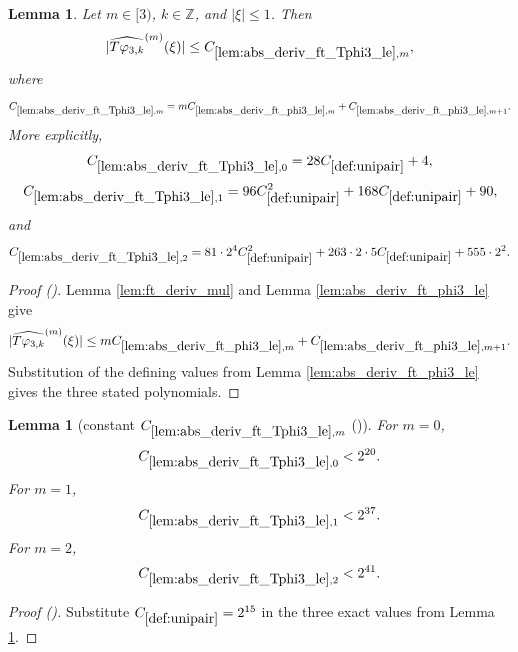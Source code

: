 \documentclass[12pt,reqno]{amsart}
\newcommand{\auto}{{({\tiny\faCar})}}
\theoremstyle{plain}
\newtheorem{lemma}[theorem]{Lemma}
\numberwithin{equation}{section}
\theoremstyle{remark}
\newcommand{\uses}[1]{}
\newcommand{\usesdefs}[1]{}
\newcommand{\Z}{{\mathbb Z}}
\begin{document}
\begin{lemma}\label{lem:abs_deriv_ft_Tphi3_le}\uses{lem:ft_deriv_mul,lem:abs_deriv_ft_phi3_le}\usesdefs{def:unipair,defn:window based bump functions}
Let $m\in[3)$, $k\in\Z$, and $|\xi|\le1$. Then
\begin{equation}\label{auto:T-varphi-three-Fourier-derivative-bound}
|\widehat{T\varphi_{3,k}}^{(m)}(\xi)|
\le C_{\ref{lem:abs_deriv_ft_Tphi3_le},m},
\end{equation}
where
\begin{equation}\label{auto:T-varphi-three-Fourier-derivative-constant}
C_{\ref{lem:abs_deriv_ft_Tphi3_le},m}
=mC_{\ref{lem:abs_deriv_ft_phi3_le},m}
+C_{\ref{lem:abs_deriv_ft_phi3_le},m+1}.
\end{equation}
More explicitly,
\begin{equation}\label{auto:T-varphi-three-Fourier-derivative-constant-zero-exact}
C_{\ref{lem:abs_deriv_ft_Tphi3_le},0}=28C_{\ref{def:unipair}}+4,
\end{equation}
\begin{equation}\label{auto:T-varphi-three-Fourier-derivative-constant-one-exact}
C_{\ref{lem:abs_deriv_ft_Tphi3_le},1}=96C_{\ref{def:unipair}}^2+168C_{\ref{def:unipair}}+90,
\end{equation}
and
\begin{equation}\label{auto:T-varphi-three-Fourier-derivative-constant-two-exact}
C_{\ref{lem:abs_deriv_ft_Tphi3_le},2}=81\cdot2^4C_{\ref{def:unipair}}^2+263\cdot2\cdot5C_{\ref{def:unipair}}+555\cdot2^2.
\end{equation}
\end{lemma}
\begin{proof}[Proof \auto]
Lemma \ref{lem:ft_deriv_mul} and Lemma \ref{lem:abs_deriv_ft_phi3_le} give
\[
|\widehat{T\varphi_{3,k}}^{(m)}(\xi)|
\le
mC_{\ref{lem:abs_deriv_ft_phi3_le},m}
+C_{\ref{lem:abs_deriv_ft_phi3_le},m+1}.
\]
Substitution of the defining values from Lemma \ref{lem:abs_deriv_ft_phi3_le} gives the three stated polynomials.
\end{proof}

\begin{lemma}[constant $C_{\ref{lem:abs_deriv_ft_Tphi3_le},m}$ \auto]\label{constant T phi three derivative}\uses{lem:abs_deriv_ft_Tphi3_le}\usesdefs{def:unipair}
For $m=0$,
\begin{equation}\label{constant T phi three derivative bound}
C_{\ref{lem:abs_deriv_ft_Tphi3_le},0}<2^{20}.
\end{equation}
For $m=1$,
\begin{equation}\label{auto:constant-T-phi-three-derivative-one}
C_{\ref{lem:abs_deriv_ft_Tphi3_le},1}<2^{37}.
\end{equation}
For $m=2$,
\begin{equation}\label{auto:constant-T-phi-three-derivative-two}
C_{\ref{lem:abs_deriv_ft_Tphi3_le},2}<2^{41}.
\end{equation}
\end{lemma}
\begin{proof}[Proof \auto]
Substitute $C_{\ref{def:unipair}}=2^{15}$ in the three exact values from Lemma \ref{lem:abs_deriv_ft_Tphi3_le}.
\end{proof}
\end{document}

